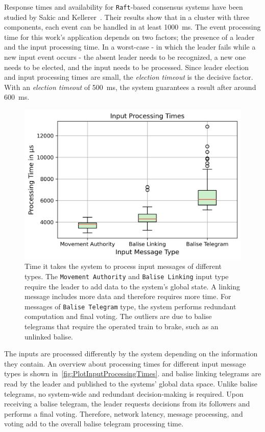 Response times and availability for \texttt{Raft}-based consensus systems have been studied by Sakic and Kellerer~\cite{SakicTimeInConsensus}.
Their results show that in a cluster with three components, each event can be handled in at least 1000~ms.
The event processing time for this work's application depends on two factors; the presence of a leader and the input processing time.
In a worst-case - in which the leader fails while a new input event occurs - the absent leader needs to be recognized, a new one needs to be elected, and the input needs to be processed.
Since leader election and input processing times are small, the \textit{election timeout} is the decisive factor.
With an \textit{election timeout} of 500~ms, the system guarantees a result after around 600~ms.


\begin{figure}[!hb]
	\centering
	\includegraphics[width=0.8\linewidth]{images/plots/inputProcessingTimes}
	\caption{Time it takes the system to process input messages of different types. The \texttt{Movement Authority} and \texttt{Balise Linking} input type require the leader to add data to the system's global state. A linking message includes more data and therefore requires more time. For messages of \texttt{Balise Telegram} type, the system performs redundant computation and final voting. The outliers are due to balise telegrams that require the operated train to brake, such as an unlinked balise.}
	\label{fig:PlotInputProcessingTimes}
\end{figure}

The inputs are processed differently by the system depending on the information they contain.
An overview about processing times for different input message types is shown in~\autoref{fig:PlotInputProcessingTimes}.
 and balise linking telegrams are read by the leader and published to the systems' global data space.
Unlike balise telegrams, no system-wide and redundant decision-making is required.
Upon receiving a balise telegram, the leader requests decisions from its followers and performs a final voting.
Therefore, network latency, message processing, and voting add to the overall balise telegram processing time.

